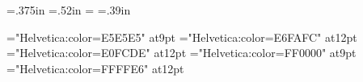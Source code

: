 \let\twocol\relax

\let\glyf\relax
\let\fchr\relax
\let\fhex\relax
\let\dist\relax
\let\rhex\relax

\newdimen\ccwd \ccwd=.375in\relax
\newdimen\ccht \ccht=.52in\relax
\newdimen\cccwd \cccwd=\ccwd\relax
\newdimen\cccht \cccht=.39in\relax

\newdimen\cdliwd \cdliwd=2.75pc
\newdimen\slcwd \slcwd=3.65pc
\def\slcc{\pcssxxx}
\def\slcu{\helvy}

\def\slnocdli{\vbox{\hbox to\cdliwd{\hfil}\vfil}}
\def\slnodist{\vbox{\hbox to1in{\hfil}\vfil}}
\def\slnoglyf{\vbox{\hbox to\slcwd{\hfil}\vfil}}

\def\tbodyrule{\noalign{\hrule\vskip3pt plus1pt minus1pt}\noalign{\allowbreak}}

\def\notcovrule{\noalign{\kern2pt\hrule height.2pt\vskip3pt plus1pt minus1pt}\noalign{\allowbreak}}

\def\tbodybreak{\noalign{\allowbreak}}

\def\sltabrule{\noalign{\hrule\vskip3pt plus1pt minus1pt}}


\font\hveee="Helvetica:color=E5E5E5" at9pt
\font\hveff="Helvetica:color=E6FAFC" at12pt
\font\hvefd="Helvetica:color=E0FCDE" at12pt
\font\hvfee="Helvetica:color=FF0000" at9pt
\font\hvffe="Helvetica:color=FFFFE6" at12pt

\def\not{\hveee}%
\def\sqchr{\hveff}%
\def\sqinv{\hvefd}%
\def\sqopq{\hvfee}%
\def\sqseq{\hvffe}%

\def\pcnot{\pceee}%
\def\pcsqchr{\pceff}%
\def\pcsqinv{\pcefd}%
\def\pcsqopq{\pcfee}%
\def\pcsqseq{\pcffe}%

\def\ucode#1{\Sans\eight\rm}

\def\cctnum#1{\vbox to1.5em{\hbox to\ccwd{\hfil\helv#1\hfil}\vfil}}
\def\cclnum#1{\llap{\vbox to\ccht{\vfil\hbox{\helv#1\kern5pt}\vfil}}}

\let\trhook\relax
\def\tvrule{\vrule}
\def\tvrulex{\vrule width1pt\relax}
\def\tablerule{\noalign{\allowbreak\hrule}}
\def\thead{\Sans\nine\rm}
\def\theadrule{\noalign{\hrule height1pt}}


